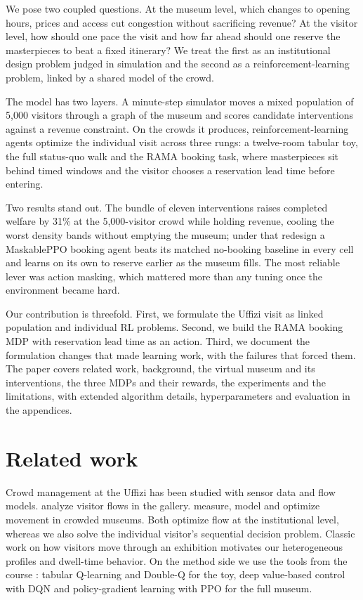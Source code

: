 \documentclass[11pt]{article}
\numberwithin{equation}{section} %
\newcommand{\added}[1]{{\color{green!50!black}#1}}
\begin{document}
We pose two coupled questions. At the museum level, which changes to opening hours, prices and access cut
congestion without sacrificing revenue? At the visitor level, how should one pace the visit and how far ahead
should one reserve the masterpieces to beat a fixed itinerary? We treat the first as an institutional design
problem judged in simulation and the second as a reinforcement-learning problem, linked by a shared model of
the crowd.

The model has two layers. A minute-step simulator moves a mixed population of 5,000 visitors through a graph
of the museum and scores candidate interventions against a revenue constraint. On the crowds it produces,
reinforcement-learning agents optimize the individual visit across three rungs: a twelve-room tabular toy, the
full status-quo walk and the RAMA booking task, where masterpieces sit behind timed windows and the visitor
chooses a reservation lead time before entering.

Two results stand out. The bundle of eleven interventions raises completed welfare by 31\% at the
5,000-visitor crowd while holding revenue, cooling the worst density bands without emptying the museum; under
that redesign a MaskablePPO booking agent beats its matched no-booking baseline in every cell and learns on
its own to reserve earlier as the museum fills. The most reliable lever was action masking, which mattered
more than any tuning once the environment became hard.

Our contribution is threefold. First, we formulate the Uffizi visit as linked population and individual RL
problems. Second, we build the RAMA booking MDP with reservation lead time as an action. Third, we document
the formulation changes that made learning work, with the failures that forced them. The paper covers related
work, \added{background}, the virtual museum and its interventions, the three MDPs and their rewards, the
experiments and \added{the limitations}, with \added{extended algorithm details}, hyperparameters and
evaluation in the appendices.

\section{Related work}

Crowd management at the Uffizi has been studied with sensor data and flow models. \citet{attanasio2022}
analyze visitor flows in the gallery. \citet{centorrino2021} measure,
model and optimize movement in crowded museums. Both optimize flow at the institutional level, whereas we also
solve the individual visitor's sequential decision problem. Classic work on how visitors move through an
exhibition \citep{veron1983} motivates our heterogeneous profiles and dwell-time behavior. On the method side
we use the tools from the course \citep{sutton2018}: tabular Q-learning and Double-Q for the toy, deep
value-based control with DQN \citep{mnih2015} and policy-gradient learning with PPO \citep{schulman2017} for the
full museum.
\end{document}
